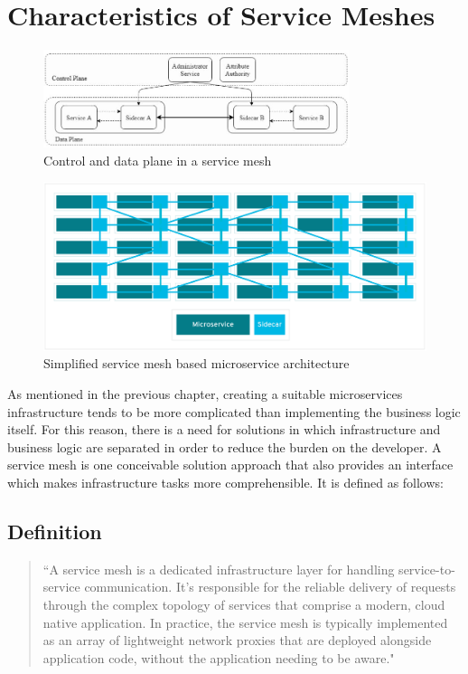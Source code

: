 \section{Characteristics of Service Meshes}

\begin{figure}
    \centering
    \includegraphics[width=0.8\textwidth]{img/mesh_detailed.JPG}
    \caption{Control and data plane in a service mesh\cite{sm4}}
    \label{fig:detailed mesh}
\end{figure}


\begin{figure}
    \includegraphics[width=\columnwidth]{img/mesh.png}
    \caption{Simplified service mesh based microservice architecture \cite{sm2}}
    \label{fig:overview}
\end{figure}

As mentioned in the previous chapter, creating a suitable microservices infrastructure tends to be more complicated than implementing the business logic itself. For this reason, there is a need for solutions in which infrastructure and business logic are separated in order to reduce the burden on the developer. A service mesh is one conceivable solution approach that also provides an interface which makes infrastructure tasks more comprehensible. It is defined as follows:

\subsection{Definition}

\begin{quote}
``A service mesh is a dedicated infrastructure layer for handling service-to-service communication. It’s responsible for the reliable delivery of requests through the complex topology of services that comprise a modern, cloud native application.
In practice, the service mesh is typically implemented as an array of lightweight network proxies that are deployed alongside application code, without the application needing to be aware." \cite[p. 123]{sm1}
\end{quote}

